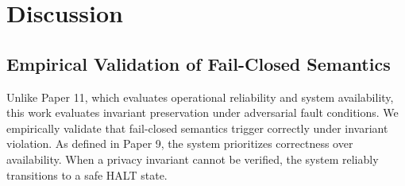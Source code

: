 \documentclass[conference]{IEEEtran}
\begin{document}
\begin{table}[h]
\caption{Invariant Verification}
\centering
{}
\label{tab:invariants}
\end{table}

\section{Discussion}

\subsection{Empirical Validation of Fail-Closed Semantics}
Unlike Paper 11, which evaluates operational reliability and system availability, this work evaluates invariant preservation under adversarial fault conditions. We empirically validate that fail-closed semantics trigger correctly under invariant violation. As defined in Paper 9, the system prioritizes correctness over availability. When a privacy invariant cannot be verified, the system reliably transitions to a safe HALT state.
\end{document}
